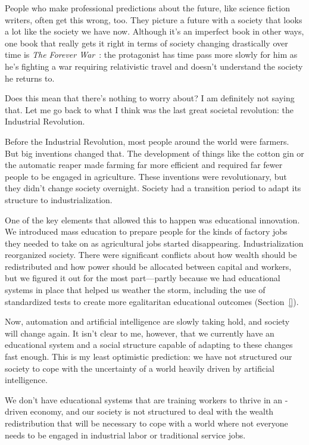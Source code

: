 People who make professional predictions about the future, like
science fiction writers, often get this wrong, too. They picture a
future with a society that looks a lot like the society we have
now. Although it's an imperfect book in other ways, one book that
really gets it right in terms of society changing drastically over
time is \textit{The Forever War}~\cite{}: the protagonist has time
pass more slowly for him as he's fighting a war requiring relativistic
travel and doesn't understand the society he returns to.

Does this mean that there's nothing to worry about? I am definitely
not saying that. Let me go back to what I think was the last great
societal revolution: the Industrial Revolution.


Before the Industrial Revolution, most people around the world were
farmers. But big inventions changed that. The development of things
like the cotton gin or the automatic reaper made farming far more
efficient and required far fewer people to be engaged in
agriculture. These inventions were revolutionary, but they didn't
change society overnight. Society had a transition period to adapt its
structure to industrialization.

One of the key elements that allowed this to happen was educational
innovation. We introduced mass education to prepare people for the
kinds of factory jobs they needed to take on as agricultural jobs
started disappearing. Industrialization reorganized society. There
were significant conflicts about how wealth should be redistributed
and how power should be allocated between capital and workers, but we
figured it out for the most part---partly because we had educational
systems in place that helped us weather the storm, including the use
of standardized tests to create more egalitaritan educational outcomes
(Section~\ref{}).

Now, automation and artificial intelligence are slowly taking hold,
and society will change again. It isn't clear to me, however, that we
currently have an educational system and a social structure capable of
adapting to these changes fast enough. This is my least optimistic
prediction: we have not structured our society to cope with the
uncertainty of a world heavily driven by artificial intelligence.

We don't have educational systems that are training workers to thrive
in an -driven economy, and our society is not structured to
deal with the wealth redistribution that will be necessary to cope
with a world where not everyone needs to be engaged in industrial
labor or traditional service jobs.

